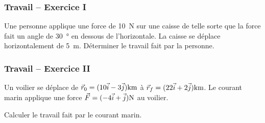 \documentclass{beamer}
\begin{document}
\begin{frame}
  \frametitle{Travail -- Exercice I}

  Une personne applique une force de \SI{10}{N} sur une caisse de telle sorte
  que la force fait un angle de \SI{30}{\degree} en dessous de l'horizontale.
  La caisse se déplace horizontalement de \SI{5}{\meter}.
  Déterminer le travail fait par la personne.

  \begin{center}
  \end{center}

\end{frame}

\begin{frame}
  \frametitle{Travail -- Exercice II}

  Un voilier se déplace de $\vr_0 = (10\xhat - 3\yhat) \si{km}$ à $\vr_f =
  (22\xhat + 2\yhat) \si{km}$.  Le courant marin applique une force $\vec{F} =
  (-4\xhat + \yhat)\si{N}$ au voilier.

  Calculer le travail fait par le courant marin.
\end{frame}
\end{document}
